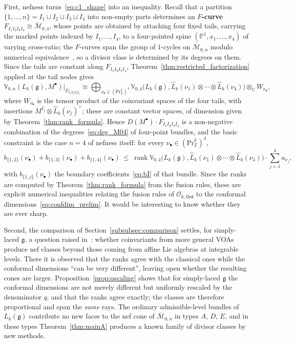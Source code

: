 \documentclass[12pt,a4paper,reqno]{amsart}
\numberwithin{equation}{section}
\theoremstyle{definition}
\newcommand{\g}{\mathfrak{g}}
\newcommand{\rk}{\operatorname{rank}}
\newcommand{\C}{\mathbb{C}}
\newcommand{\Z}{\mathbb{Z}}
\renewcommand{\P}{\mathbb{P}}
\newcommand{\M}{\mathcal{M}}
\def\O{\mathcal{O}}
\def\Ord{\mathsf{Ord}}
\def\Pr{\mathrm{Pr}}
\def\o{\otimes}
\def\ds{\dots}
\def\VV{\mathbb{V}}
\begin{document}
First, nefness turns~\eqref{eq:c1_shape} into an inequality. Recall that a partition $\{1,\ds,n\}=I_1\sqcup I_2\sqcup I_3\sqcup I_4$ into non-empty parts determines an \textbf{$F$-curve} $F_{I_1I_2I_3I_4}\cong\overline{\M}_{0,4}$, whose points are obtained by attaching four fixed tails, carrying the marked points indexed by $I_1,\ds,I_4$, to a four-pointed spine $(\P^1,x_1,\ds,x_4)$ of varying cross-ratio; the $F$-curves span the group of $1$-cycles on $\overline{\M}_{0,n}$ modulo numerical equivalence~\cite{GKM02}, so a divisor class is determined by its degrees on them. Since the tails are constant along $F_{I_1I_2I_3I_4}$, Theorem~\ref{thm:restricted_factorization} applied at the tail nodes gives
\[
\VV_{0,n}(L_k(\g),M^\bullet)\big|_{F_{I_1I_2I_3I_4}}
\cong\bigoplus_{\nu_\bullet\in(\Pr^k_\Z)^4}
\VV_{0,4}\big(L_k(\g),\hat{L}_k(\nu_1)\o\cdots\o\hat{L}_k(\nu_4)\big)\o_\C W_{\nu_\bullet},
\]
where $W_{\nu_\bullet}$ is the tensor product of the coinvariant spaces of the four tails, with insertions $M^{I_j}\o\hat{L}_k(\nu_j)^\vee$; these are constant vector spaces, of dimension given by Theorem~\ref{thm:rank_formula}. Hence $D(M^\bullet)\cdot F_{I_1I_2I_3I_4}$ is a non-negative combination of the degrees~\eqref{eq:deg_M04} of four-point bundles, and the basic constraint is the case $n=4$ of nefness itself: for every $\nu_\bullet\in(\Pr^k_\Z)^4$,
\[
b_{\{1,2\}}(\nu_\bullet)+b_{\{1,3\}}(\nu_\bullet)+b_{\{1,4\}}(\nu_\bullet)\ \leq\ \rk\VV_{0,4}\big(L_k(\g),\hat{L}_k(\nu_1)\o\cdots\o\hat{L}_k(\nu_4)\big)\cdot\sum_{j=1}^4 a_{\nu_j},
\]
with $b_{\{1,j\}}(\nu_\bullet)$ the boundary coefficients~\eqref{eq:bI} of that bundle. Since the ranks are computed by Theorem~\ref{thm:rank_formula} from the fusion rules, these are explicit numerical inequalities relating the fusion rules of $\O_{k,\Ord}$ to the conformal dimensions~\eqref{eq:confdim_prelim}. It would be interesting to know whether they are ever sharp.

Second, the comparison of Section~\ref{subsubsec:comparison} settles, for simply-laced $\g$, a question raised in~\cite[Remark 10.0.3]{DG}: whether coinvariants from more general VOAs produce nef classes beyond those coming from affine Lie algebras at integrable levels. There it is observed that the ranks agree with the classical ones while the conformal dimensions ``can be very different'', leaving open whether the resulting cones are larger. Proposition~\ref{prop:qscaling} shows that for simply-laced $\g$ the conformal dimensions are not merely different but uniformly rescaled by the denominator $q$, and that the ranks agree exactly; the classes are therefore proportional and span the \emph{same} rays. The ordinary admissible-level bundles of $L_k(\g)$ contribute no new faces to the nef cone of $\overline{\M}_{0,n}$ in types $A$, $D$, $E$, and in these types Theorem~\ref{thm:mainA} produces a known family of divisor classes by new methods.
\end{document}
